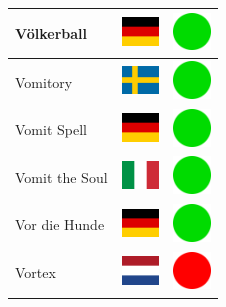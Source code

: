 \documentclass[12pt, a4paper, twoside]{report}
\begin{document}
\begin{center}
\begin{longtable}{|p{5cm}|p{2cm}|p{2cm}|}
 Völkerball                                                 & \includegraphics[width=1cm]{4x3/de} &   \includegraphics[width=1cm]{likes/y} \\ \hline
 Vomitory                                                   & \includegraphics[width=1cm]{4x3/se} &   \includegraphics[width=1cm]{likes/y} \\ \hline
 Vomit Spell                                                & \includegraphics[width=1cm]{4x3/de} &   \includegraphics[width=1cm]{likes/y} \\ \hline
 Vomit the Soul                                             & \includegraphics[width=1cm]{4x3/it} &   \includegraphics[width=1cm]{likes/y} \\ \hline
 Vor die Hunde                                              & \includegraphics[width=1cm]{4x3/de} &   \includegraphics[width=1cm]{likes/y} \\ \hline
 Vortex                                                     & \includegraphics[width=1cm]{4x3/nl} &   \includegraphics[width=1cm]{likes/n} \\ \hline

\end{longtable}
\end{center}
\end{document}
